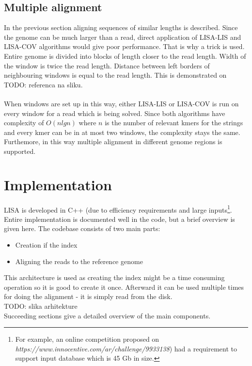 \documentclass[times, utf8, diplomski]{fer}
\begin{document}
\subsection{Multiple alignment}
In the previous section aligning sequences of similar lengths is described. Since the genome can be much larger than a read, direct application of LISA-LIS and LISA-COV algorithms would give poor performance. That is why a trick is used. Entire genome is divided into blocks of length closer to the read length. Width of the window is twice the read length. Distance between left borders of neighbouring windows is equal to the read length. This is demonstrated on TODO: referenca na sliku.\\
\\
When windows are set up in this way, either LISA-LIS or LISA-COV is run on every window for a read which is being solved. Since both algorithms have complexity of $O(n lg n)$ where $n$ is the number of relevant kmers for the strings and every kmer can be in at most two windows, the complexity stays the same. Furthemore, in this way multiple alignment in different genome regions is supported.

\section{Implementation}

LISA is developed in C++ (due to efficiency requirements and large inputs\footnote{For example, an online competition proposed on \emph{https://www.innocentive.com/ar/challenge/9933138}) had a requirement to support input database which is 45 Gb in size.}. Entire implementation is documented well in the code, but a brief overview is given here. The codebase consists of two main parts:
\begin{itemize}
\item Creation if the index
\item Aligning the reads to the reference genome
\end{itemize}
This architecture is used as creating the index might be a time consuming operation so it is good to create it once. Afterward it can be used multiple times for doing the alignment - it is simply read from the disk.\\
TODO: slika arhitekture\\
Succeeding sections give a detailed overview of the main components.
\end{document}

